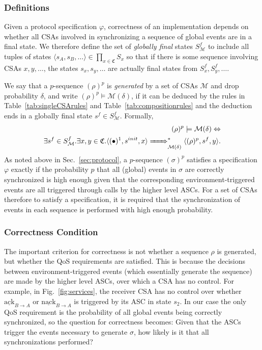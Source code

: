 \documentclass{sig-alternate}
\renewcommand{\v}{\varphi}
\renewcommand{\d}{\delta}
\newcommand{\M}{\mathcal{M}}
\newcommand{\SAP}{\mathfrak{C}}
\newcommand{\locev}[1]{\underline{#1}}
\newcommand{\generated}{\models {\M(\d)}}
\newcommand{\ack}{\mathrm{ack}}
\newcommand{\nack}{\mathrm{nack}}
\newcommand{\eenv}[3]{\locev{#1}_{{#2} \rightarrow {#3}}}
\newcommand{\define}{\sl}
\newcommand{\fig}[1]{Fig.\ \ref{fig:#1}}
\renewcommand{\sec}[1]{Sec.\ \ref{sec:#1}}
\newcommand{\tab}[1]{Table~\ref{tab:#1}}
\begin{document}
\subsubsection{Definitions}

Given a protocol specification $\v$, correctness of an implementation depends on whether all CSAs involved in synchronizing a sequence of global events are in a final state. We therefore define the set of {\define globally final} states $S^f_\M$ to include all tuples of states $\langle s_A, s_B, \ldots \rangle \in \prod_{x \in \SAP}S_x$ so that if there is some sequence involving CSAs $x, y, \ldots$, the states $s_x, s_y, \ldots$ are actually final states from $S_x^f, S_y^f, \ldots$.

We say that a $p$-sequence $(\rho)^p$ is {\define generated} by a set of CSAs $\M$ and drop probability $\d$, and write $(\rho)^p \generated$, if it can be deduced by the rules in \tab{singleCSArules} and \tab{compositionrules} and the deduction ends in a globally final state $s^f \in S^f_{\M}$. Formally,
\begin{align*}
(\rho)^p \generated \Leftrightarrow \\
\exists s^f \in S^f_{\M} . \exists x, y \in \SAP . \langle (\bullet)^1, s^{init}, x \rangle \bigstep{}^* \langle (\rho)^p, s^f, y \rangle.
\end{align*}
As noted above in \sec{protocol}, a $p$-sequence $(\sigma)^p$ satisfies a specification $\v$ exactly if the probability $p$ that all (global) events in $\sigma$ are correctly synchronized is high enough given that the corresponding environment-triggered events are all triggered through calls by the higher level ASCs. For a set of CSAs therefore to satisfy a specification, it is required that the synchronization of events in each sequence is performed with high enough probability.


\subsubsection{Correctness Condition}

The important criterion for correctness is not whether a sequence $\rho$ is generated, but whether the QoS requirements are satisfied. This is because the decisions between environment-triggered events (which essentially generate the sequence) are made by the higher level ASCs, over which a CSA has no control. For example, in \fig{services}, the receiver CSA has no control over whether $\eenv{\ack}{B}{A}$ or $\eenv{\nack}{B}{A}$ is triggered by its ASC in state $s_2$. In our case the only QoS requirement is the probability of all global events being correctly synchronized, so the question for correctness becomes: Given that the ASCs trigger the events necessary to generate $\sigma$, how likely is it that all synchronizations performed?
\end{document}
